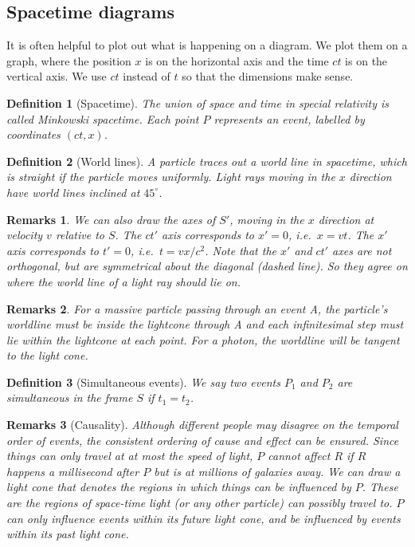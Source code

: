 \documentclass[a4paper]{article}
\newtheorem{defi}{Definition}[section]
\newtheorem{remarks}{Remarks}[section]
\theoremstyle{new}
\begin{document}
\subsection{Spacetime diagrams}
It is often helpful to plot out what is happening on a diagram. We plot them on a graph, where the position $x$ is on the horizontal axis and the time $ct$ is on the vertical axis. We use $ct$ instead of $t$ so that the dimensions make sense.
\begin{defi}[Spacetime]
  The union of space and time in special relativity is called Minkowski spacetime. Each point $P$ represents an event, labelled by coordinates $(ct, x)$. 
\end{defi}
\begin{defi}[World lines]
  A particle traces out a world line in spacetime, which is straight if the particle moves uniformly. Light rays moving in the $x$ direction have world lines inclined at $45^\circ$.
\end{defi}
\begin{remarks}
We can also draw the axes of $S'$, moving in the $x$ direction at velocity $v$ relative to $S$. The $ct'$ axis corresponds to $x' = 0$, i.e.\ $x = vt$. The $x'$ axis corresponds to $t' = 0$, i.e.\ $t = vx/c^2$. Note that the $x'$ and $ct'$ axes are not orthogonal, but are symmetrical about the diagonal (dashed line). So they agree on where the world line of a light ray should lie on.
\end{remarks}
\begin{remarks}
For a massive particle passing through an event A, the particle's worldline must be inside the lightcone through A and each infinitesimal step must lie within the lightcone at each point. For a photon, the worldline will be tangent to the light cone.
\end{remarks}
\begin{defi}[Simultaneous events]
  We say two events $P_1$ and $P_2$ are simultaneous in the frame $S$ if $t_1 = t_2$.
\end{defi}
\begin{remarks}[Causality]
Although different people may disagree on the temporal order of events, the consistent ordering of cause and effect can be ensured. Since things can only travel at at most the speed of light, $P$ cannot affect $R$ if $R$ happens a millisecond after $P$ but is at millions of galaxies away. We can draw a light cone that denotes the regions in which things can be influenced by $P$. These are the regions of space-time light (or any other particle) can possibly travel to. $P$ can only influence events within its future light cone, and be influenced by events within its past light cone.
\end{remarks}
\end{document}
